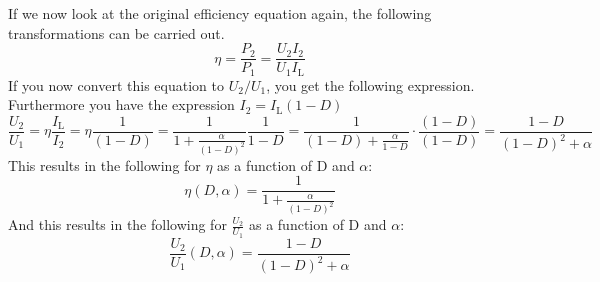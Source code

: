 \begin{solutionblock}
\begin{equation}
    \label{eq:efficiencyOverD}
\end{equation}
If we now look at the original efficiency equation again, the following transformations can be carried out.
\begin{equation}
    \eta=\frac{P_\mathrm{2}}{P_\mathrm{1}} = \frac{U_\mathrm{2}I_\mathrm{2}}{U_\mathrm{1}I_\mathrm{L}}
\end{equation}
If you now convert this equation to $U_\mathrm{2}/U_\mathrm{1}$, you get the following expression. Furthermore you have the expression $I_\mathrm{2}=I_\mathrm{L}(1-D)$
\begin{equation}
    \frac{U_\mathrm{2}}{U_\mathrm{1}}=\eta \frac{I_\mathrm{L}}{I_\mathrm{2}}= \eta \frac{1}{(1-D)}=\frac{1}{1+\frac{\alpha}{(1-D)^2}}\frac{1}{1-D}=\frac{1}{(1-D)+\frac{\alpha}{1-D}}\cdot \frac{(1-D)}{(1-D)}=\frac{1-D}{(1-D)^2+\alpha}
    \label{eq:voltageRatioOverD}
\end{equation}
This results in the following for $\eta$ as a function of D and $\alpha$:
\begin{equation}
    \eta(D,\alpha)=\frac{1}{1+\frac{\alpha}{(1-D)^2}}
\end{equation}
And this results in the following for $\frac{U_\mathrm{2}}{U_\mathrm{1}}$ as a function of D and $\alpha$:
\begin{equation}
    \frac{U_\mathrm{2}}{U_\mathrm{1}}(D,\alpha)=\frac{1-D}{(1-D)^2+\alpha}
\end{equation}
\end{solutionblock}

